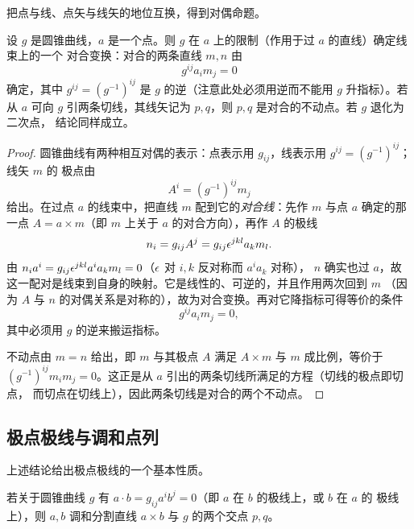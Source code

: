 把点与线、点矢与线矢的地位互换，得到对偶命题。

\begin{theorem}\label{thm:conic-dual}
设 $g$ 是圆锥曲线，$a$ 是一个点。则 $g$ 在 $a$ 上的限制（作用于过 $a$ 的直线）确定线束上的一个
对合变换：对合的两条直线 $m,n$ 由
\[
g^{ij}a_im_j=0
\]
确定，其中 $g^{ij}=(g^{-1})^{ij}$ 是 $g$ 的逆（注意此处必须用逆而不能用 $g$ 升指标）。若从 $a$
可向 $g$ 引两条切线，其线矢记为 $p,q$，则 $p,q$ 是对合的不动点。若 $g$ 退化为二次点，
结论同样成立。
\end{theorem}

\begin{proof}
圆锥曲线有两种相互对偶的表示：点表示用 $g_{ij}$，线表示用 $g^{ij}=(g^{-1})^{ij}$；线矢 $m$ 的
极点由
\[
A^i=(g^{-1})^{ij}m_j
\]
给出。在过点 $a$ 的线束中，把直线 $m$ 配到它的\emph{对合线}：先作 $m$ 与点 $a$ 确定的那一点
$A=a\times m$（即 $m$ 上关于 $a$ 的对合方向），再作 $A$ 的极线
\[
n_i=g_{ij}A^j=g_{ij}\epsilon^{jkl}a_km_l .
\]
由 $n_ia^i=g_{ij}\epsilon^{jkl}a^ia_km_l=0$（$\epsilon$ 对 $i,k$ 反对称而 $a^ia_k$ 对称），
$n$ 确实也过 $a$，故这一配对是线束到自身的映射。它是线性的、可逆的，并且作用两次回到 $m$
（因为 $A$ 与 $n$ 的对偶关系是对称的），故为对合变换。再对它降指标可得等价的条件
\[
g^{ij}a_im_j=0 ,
\]
其中必须用 $g$ 的逆来搬运指标。

不动点由 $m=n$ 给出，即 $m$ 与其极点 $A$ 满足 $A\times m$ 与 $m$ 成比例，等价于
$(g^{-1})^{ij}m_im_j=0$。这正是从 $a$ 引出的两条切线所满足的方程（切线的极点即切点，
而切点在切线上），因此两条切线是对合的两个不动点。
\end{proof}

\subsection{极点极线与调和点列}

上述结论给出极点极线的一个基本性质。

\begin{theorem}[极线与调和分割]\label{thm:polar}
若关于圆锥曲线 $g$ 有 $a\cdot b=g_{ij}a^ib^j=0$（即 $a$ 在 $b$ 的极线上，或 $b$ 在 $a$ 的
极线上），则 $a,b$ 调和分割直线 $a\times b$ 与 $g$ 的两个交点 $p,q$。
\end{theorem}

